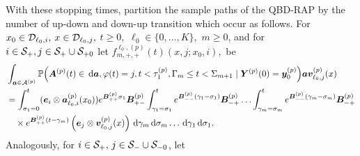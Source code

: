 With these stopping times, partition the sample paths of the QBD-RAP by the number of up-down and down-up transition which occur as follows. For \(x_0\in\mathcal{D}_{\ell_0,i},\) \(x\in\mathcal{D}_{\ell_0,j},\) \(t\geq0,\) \(\ell_0\in\{0,\dots,K\},\) \(m\geq 0\), and for \(i\in\mathcal{S}_+,j\in\mathcal S_+\cup\mathcal S_{+0}\) let \(f^{\ell_0,(p)}_{m,+,+}(t)( x,j; x_0,i) ,\) be 
\begin{align}
	&\int_{\boldsymbol a \in\mathcal A^{(p)}}\mathbb P\Big(\boldsymbol A^{(p)}(t)\in \, \mathrm{d} \boldsymbol a, \varphi(t) = j, t<\tau_1^{(p)}, \Gamma_m\leq t<\Sigma_{m+1} \nonumber
	\mid \boldsymbol Y^{(p)}(0)=\boldsymbol y_0^{(p)}\Big)
	\boldsymbol a{\boldsymbol v}_{\ell_0,j}^{(p)}(x) \nonumber
	\\
	&=\int_{\sigma_1=0}^t (\boldsymbol e_i\otimes \boldsymbol  a_{\ell_0,i}^{(p)}(x_0)) e^{\boldsymbol{B}^{(p)}_{++}\sigma_1}\boldsymbol{B}^{(p)}_{+-}	\nonumber
	\int_{\gamma_1=\sigma_1}^{t} e^{\boldsymbol{B}^{(p)}_{--}(\gamma_1-\sigma_1)}\boldsymbol{B}^{(p)}_{-+}
	\hdots 
	 \int_{\gamma_m=\sigma_{m}}^{t} e^{\boldsymbol{B}^{(p)}_{--}(\gamma_m-\sigma_{m})}\boldsymbol{B}^{(p)}_{-+}\\&\quad\times
	e^{\boldsymbol{B}^{(p)}_{++}(t-\gamma_m)}\left(\boldsymbol e_j  \otimes {\boldsymbol v}_{\ell_0,j}^{(p)}(x)\right) 
	\, \mathrm{d} \gamma_m\, \mathrm{d} \sigma_m\dots \, \mathrm{d} \gamma_1\, \mathrm{d} \sigma_1 . \label{eqn: approx end conv}
\end{align}
Analogously, for \(i\in\mathcal S_+ ,\,j\in\mathcal{S}_{-}\cup\mathcal S_{-0}\), let 

